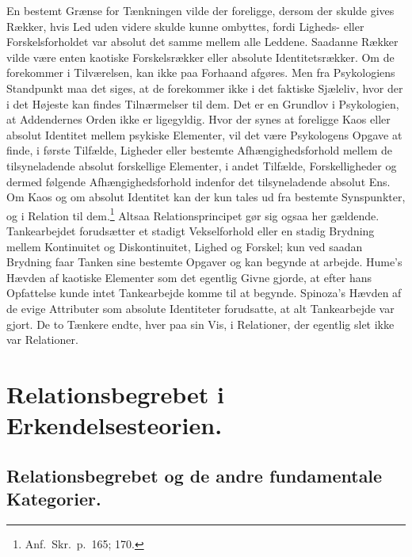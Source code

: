 \documentclass[12pt]{article}
\newcommand{\opage}[1]{\marginnote{\footnotesize\textit{[#1]}}}
\begin{document}
\bigskip
En bestemt Grænse for Tænkningen vilde der foreligge, dersom der skulde gives
Rækker, hvis Led uden videre skulde kunne ombyttes, fordi Ligheds- eller
Forskelsforholdet var absolut det samme mellem alle Leddene. Saadanne Rækker
vilde være enten kaotiske Forskelsrækker eller absolute Identitetsrækker. Om de
forekommer i Tilværelsen, kan ikke paa Forhaand afgøres. Men fra Psykologiens
Standpunkt maa det siges, at de forekommer ikke i det faktiske Sjæleliv, hvor
der i det Højeste kan findes Tilnærmelser til dem. Det er en Grundlov i
Psykologien, at Addendernes Orden ikke er ligegyldig. Hvor der synes at
foreligge Kaos eller absolut Identitet mellem psykiske Elementer, vil det være
Psykologens Opgave at finde, i første Tilfælde, Ligheder eller bestemte
Afhængighedsforhold mellem de tilsyneladende absolut forskellige Elementer, i
andet Tilfælde, Forskelligheder og dermed følgende Afhængighedsforhold indenfor
det tilsyneladende absolut Ens. Om Kaos og om absolut Identitet kan der kun
tales ud fra bestemte Synspunkter, og i Relation til dem.\footnote{Anf.\ Skr.\
  p.~165; 170.} Altsaa Relationsprincipet gør sig ogsaa her gældende.
Tankearbejdet forudsætter et stadigt Vekselforhold eller en stadig Brydning
mellem Kontinuitet og Diskontinuitet, Lighed og Forskel; kun ved saadan Brydning
faar Tanken sine bestemte Opgaver og kan begynde at arbejde. Hume's Hævden af
kaotiske Elementer som det egentlig Givne gjorde, at efter hans Opfattelse kunde
intet Tankearbejde komme til at begynde. Spinoza's Hævden af de evige Attributer
\opage{26} \setcounter{footnote}{0}
som absolute Identiteter forudsatte, at alt Tankearbejde var
gjort. De to Tænkere endte, hver paa sin Vis, i Relationer,
der egentlig slet ikke var Relationer.

\section{Relationsbegrebet i Erkendelsesteorien.}\label{sec:3}

\subsection{Relationsbegrebet og de andre fundamentale Kategorier.}\label{sec:3a}
\end{document}
